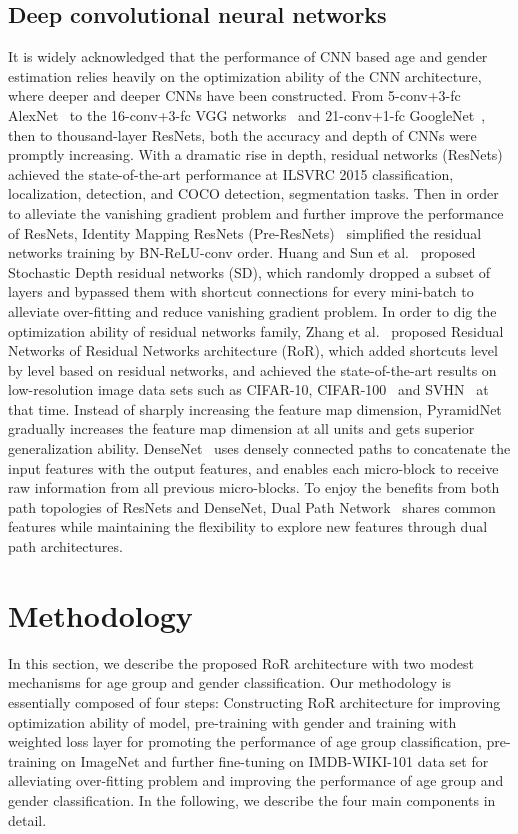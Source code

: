 \documentclass[journal]{IEEEtran}
\begin{document}
\subsection{Deep convolutional neural networks}
It is widely acknowledged that the performance of CNN based age and gender estimation relies heavily on the optimization ability of the CNN architecture, where deeper and deeper CNNs have been constructed.
From 5-conv+3-fc AlexNet~\cite{Alex} to the 16-conv+3-fc VGG networks~\cite{simonyan2014vgg} and 21-conv+1-fc GoogleNet~\cite{szegedy2015googlenet}, then to thousand-layer ResNets, both the accuracy and depth of CNNs were promptly increasing. With a dramatic rise in depth, residual networks (ResNets)~\cite{ResNet} achieved the state-of-the-art performance at ILSVRC 2015 classification, localization, detection, and COCO detection, segmentation tasks. Then in order to alleviate the vanishing gradient problem and further improve the performance of ResNets, Identity Mapping ResNets (Pre-ResNets)~\cite{he2016preresnets} simplified the residual networks training by BN-ReLU-conv order. Huang and Sun et al.~\cite{huang2016SD} proposed Stochastic Depth residual networks (SD), which randomly dropped a subset of layers and bypassed them with shortcut connections for every mini-batch to alleviate over-fitting and reduce vanishing gradient problem. In order to dig the optimization ability of residual networks family, Zhang et al.~\cite{Ror} proposed Residual Networks of Residual Networks architecture (RoR), which added shortcuts level by level based on residual networks, and achieved the state-of-the-art results on low-resolution image data sets such as CIFAR-10, CIFAR-100~\cite{krizhevsky2009cifar} and SVHN~\cite{netzer2011SVHN} at that time. Instead of sharply increasing the feature map dimension, PyramidNet~\cite{Pyramidal} gradually increases the feature map dimension at all units and gets superior generalization ability. DenseNet~\cite{Densenet} uses densely connected paths to concatenate the input features with the output features, and enables each micro-block to receive raw information from all previous micro-blocks. To enjoy the benefits from both path topologies of ResNets and DenseNet, Dual Path Network~\cite{Dpn} shares common features while maintaining the flexibility to explore new features through dual path architectures.

\section{Methodology}\label{sec3}
In this section, we describe the proposed RoR architecture with two modest mechanisms for age group and gender classification. Our methodology is essentially composed of four steps: Constructing RoR architecture for improving optimization ability of model, pre-training with gender and training with weighted loss layer for promoting the performance of age group classification, pre-training on ImageNet and further fine-tuning on IMDB-WIKI-101 data set for alleviating over-fitting problem and improving the performance of age group and gender classification. In the following, we describe the four main components in detail.
\end{document}

